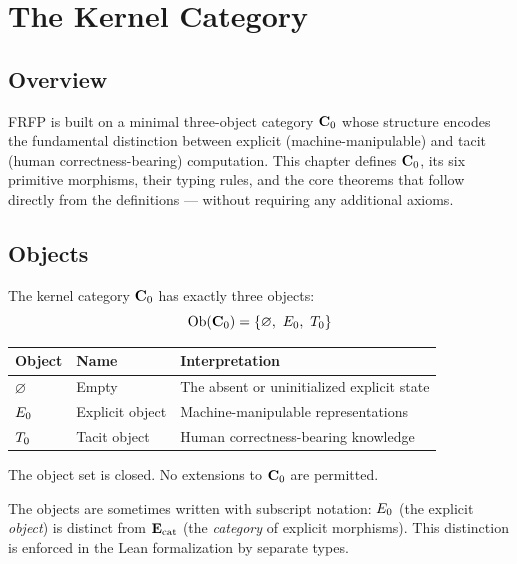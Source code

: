 \section{The Kernel Category}
\label{ch:kernel}

\subsection{Overview}

FRFP is built on a minimal three-object category $\mathbf{C}_0$ whose structure encodes
the fundamental distinction between explicit (machine-manipulable) and tacit
(human correctness-bearing) computation. This chapter defines $\mathbf{C}_0$, its six
primitive morphisms, their typing rules, and the core theorems that follow directly
from the definitions --- without requiring any additional axioms.

\subsection{Objects}

\begin{definition}
The kernel category $\mathbf{C}_0$ has exactly three objects:
\[
  \mathrm{Ob}(\mathbf{C}_0) = \{\varnothing,\ E_0,\ T_0\}
\]
\end{definition}

\begin{center}
\begin{tabular}{lll}
\toprule
Object & Name & Interpretation \\
\midrule
$\varnothing$ & Empty & The absent or uninitialized explicit state \\
$E_0$ & Explicit object & Machine-manipulable representations \\
$T_0$ & Tacit object & Human correctness-bearing knowledge \\
\bottomrule
\end{tabular}
\end{center}

The object set is closed. No extensions to $\mathbf{C}_0$ are permitted.

The objects are sometimes written with subscript notation: $E_0$ (the explicit
\emph{object}) is distinct from $\mathbf{E}_{\mathrm{cat}}$ (the \emph{category} of explicit
morphisms). This distinction is enforced in the Lean formalization by separate
types.

